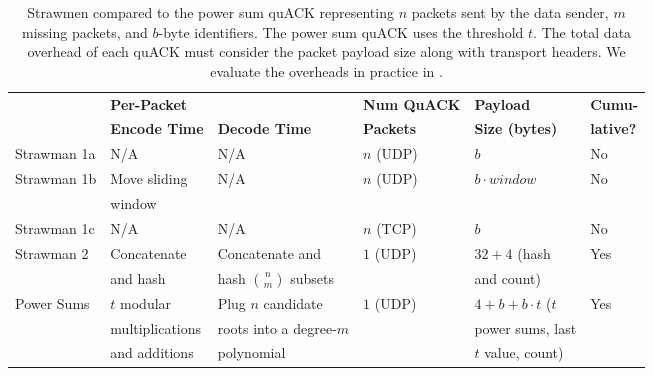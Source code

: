 \begin{table*}[ht]
  \centering
  \small
  \begin{tabular}{llllll}
    \toprule
    & \bf Per-Packet & \bf & \bf Num QuACK & \bf Payload & \bf Cumu-\\
    & \bf Encode Time & \bf Decode Time & \bf Packets & \bf Size (bytes) & \bf lative?\\
    \midrule
    Strawman 1a & N/A & N/A & $n$ (UDP) & $b$ & No \\
    Strawman 1b & Move sliding & N/A & $n$ (UDP) & $b \cdot window$ & No \\
    & window  & & & & \\
    Strawman 1c & N/A & N/A & $n$ (TCP) & $b$ & No \\
    Strawman 2 & Concatenate & Concatenate and & $1$ (UDP) & $32+4$ (hash & Yes \\
    & and hash & hash $\binom{n}{m}$ subsets & & and count) & \\
    Power Sums & $t$ modular & Plug $n$ candidate & $1$ (UDP) & $4+b+b\cdot t$ ($t$ & Yes \\
    & multiplications & roots into a degree-$m$ & & power sums, last & \\
    & and additions & polynomial & & $t$ value, count) & \\
    \bottomrule
  \end{tabular}
  \caption{Strawmen compared to the power sum quACK representing $n$ packets
  sent by the data sender, $m$ missing packets, and $b$-byte identifiers. The
  power sum quACK uses the threshold $t$. The total data overhead of each
  quACK must consider the packet payload size along with transport headers.
  We evaluate the overheads in practice in .
  }
  \label{tab:strawmen-theoretical}
\end{table*}
